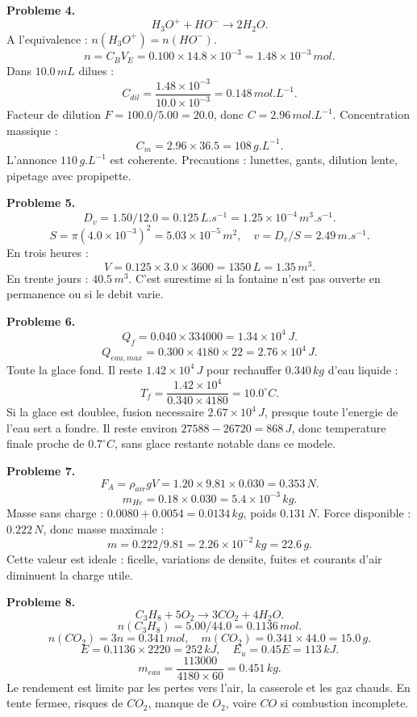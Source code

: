 \documentclass[11pt,a4paper]{article}
\begin{document}
\begin{corrige}
\textbf{Probleme 4.}
\[
H_3O^+ + HO^-\rightarrow2H_2O.
\]
A l'equivalence : \(n(H_3O^+)=n(HO^-)\).
\[
n=C_BV_E=0.100\times14.8\times10^{-3}=1.48\times10^{-3}\,mol.
\]
Dans \(10.0\,mL\) dilues :
\[
C_{dil}=\frac{1.48\times10^{-3}}{10.0\times10^{-3}}=0.148\,mol.L^{-1}.
\]
Facteur de dilution \(F=100.0/5.00=20.0\), donc \(C=2.96\,mol.L^{-1}\). Concentration massique :
\[
C_m=2.96\times36.5=108\,g.L^{-1}.
\]
L'annonce \(110\,g.L^{-1}\) est coherente. Precautions : lunettes, gants, dilution lente, pipetage avec propipette.
\end{corrige}

\begin{corrige}
\textbf{Probleme 5.}
\[
D_v=1.50/12.0=0.125\,L.s^{-1}=1.25\times10^{-4}\,m^3.s^{-1}.
\]
\[
S=\pi(4.0\times10^{-3})^2=5.03\times10^{-5}\,m^2,
\quad v=D_v/S=2.49\,m.s^{-1}.
\]
En trois heures :
\[
V=0.125\times3.0\times3600=1350\,L=1.35\,m^3.
\]
En trente jours : \(40.5\,m^3\). C'est surestime si la fontaine n'est pas ouverte en permanence ou si le debit varie.
\end{corrige}

\begin{corrige}
\textbf{Probleme 6.}
\[
Q_f=0.040\times334000=1.34\times10^4\,J.
\]
\[
Q_{eau,max}=0.300\times4180\times22=2.76\times10^4\,J.
\]
Toute la glace fond. Il reste \(1.42\times10^4\,J\) pour rechauffer \(0.340\,kg\) d'eau liquide :
\[
T_f=\frac{1.42\times10^4}{0.340\times4180}=10.0^\circ C.
\]
Si la glace est doublee, fusion necessaire \(2.67\times10^4\,J\), presque toute l'energie de l'eau sert a fondre. Il reste environ \(27588-26720=868\,J\), donc temperature finale proche de \(0.7^\circ C\), sans glace restante notable dans ce modele.
\end{corrige}

\begin{corrige}
\textbf{Probleme 7.}
\[
F_A=\rho_{air}gV=1.20\times9.81\times0.030=0.353\,N.
\]
\[
m_{He}=0.18\times0.030=5.4\times10^{-3}\,kg.
\]
Masse sans charge : \(0.0080+0.0054=0.0134\,kg\), poids \(0.131\,N\). Force disponible : \(0.222\,N\), donc masse maximale :
\[
m=0.222/9.81=2.26\times10^{-2}\,kg=22.6\,g.
\]
Cette valeur est ideale : ficelle, variations de densite, fuites et courants d'air diminuent la charge utile.
\end{corrige}

\begin{corrige}
\textbf{Probleme 8.}
\[
C_3H_8+5O_2\rightarrow3CO_2+4H_2O.
\]
\[
n(C_3H_8)=5.00/44.0=0.1136\,mol.
\]
\[
n(CO_2)=3n=0.341\,mol,\quad m(CO_2)=0.341\times44.0=15.0\,g.
\]
\[
E=0.1136\times2220=252\,kJ,\quad E_u=0.45E=113\,kJ.
\]
\[
m_{eau}=\frac{113000}{4180\times60}=0.451\,kg.
\]
Le rendement est limite par les pertes vers l'air, la casserole et les gaz chauds. En tente fermee, risques de \(CO_2\), manque de \(O_2\), voire \(CO\) si combustion incomplete.
\end{corrige}
\end{document}
